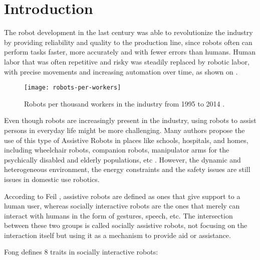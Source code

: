 \chapter{Introduction}\label{chp:intro}

The robot development in the last century was able to revolutionize the industry by providing reliability and quality to the production line, since robots often can perform tasks faster, more accurately and with fewer errors than humans. Human labor that was often repetitive and risky was steadily replaced by robotic labor, with precise movements and increasing automation over time, as shown on .

\begin{figure}[!ht]
    \centering
    \texttt{[image: robots-per-workers]}
    \caption{Robots per thousand workers in the industry from 1995 to 2014 \cite{dauth2017german}.}
    \label{fig:robots-per-workers}
\end{figure}

Even though robots are increasingly present in the industry, using robots to assist persons in everyday life might be more challenging. Many authors propose the use of this type of Assistive Robots in places like schools, hospitals, and homes, including wheelchair robots, companion robots, manipulator arms for the psychically disabled and elderly populations, etc \cite{feil2005defining}. However, the dynamic and heterogeneous environment, the energy constraints and the safety issues are still issues in domestic use robotics.

According to Feil \cite{feil2005defining}, assistive robots are defined as ones that give support to a human user, whereas socially interactive robots are the ones that merely can interact with humans in the form of gestures, speech, etc. The intersection between these two groups is called socially assistive robots, not focusing on the interaction itself but using it as a mechanism to provide aid or assistance.

Fong \cite{fong2003survey} defines 8 traits in socially interactive robots:

